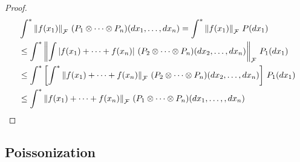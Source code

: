 \begin{proof}
\begin{align*}
&\int^* \left \lVert f(x_1) \right \rVert_{\mathcal{F}} \, (P_1 \otimes \dotsb \otimes P_n)(dx_1, \dotsc, dx_n) 
= \int^* \left \lVert f(x_1) \right \rVert_{\mathcal{F}} \, P(dx_1) \\
&\leq \int^* \left \lVert \int \left \vert f(x_1) +  \dotsb + f(x_n) \right \vert \, (P_2 \otimes \dotsb \otimes P_n)(dx_2, \dotsc, dx_n) \right \rVert_{\mathcal{F}}  \, P_1(dx_1) \\
&\leq \int^* \left[ \int^* \left \lVert f(x_1) + \dotsb + f(x_n) \right \rVert_{\mathcal{F}} \, (P_2 \otimes \dotsb \otimes P_n)(dx_2, \dotsc, dx_n) \right ] \, P_1(dx_1) \\
&\leq \int^* \left \lVert f(x_1) + \dotsb + f(x_n) \right \rVert_{\mathcal{F}}  \, (P_1 \otimes \dotsb \otimes P_n)(dx_1, \dotsc, ,dx_n)
\end{align*}
\end{proof}

\subsection{Poissonization}

